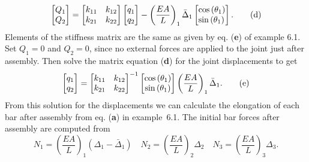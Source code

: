 \documentclass{AeroStructure-ERJohnson}
\begin{document}
\begin{example*}
\begin{gather}
\left[\begin{array}{@{}l@{}}Q_{1} \\Q_{2}\end{array}\right]=\left[\begin{array}{@{}ll@{}}k_{11} & k_{12} \\k_{21} & k_{22}\end{array}\right]\left[\begin{array}{@{}l@{}}q_{1} \\q_{2}\end{array}\right]-\left(\frac{E A}{L}\right)_{1}\bar{\Delta}_{1}\left[\begin{array}{@{}l@{}}\cos \left(\theta_{1}\right) \\\sin \left(\theta_{1}\right)\end{array}\right].\tag{d}
\end{gather}
Elements of the stiffness matrix are the same as given by eq. (\textbf{e}) of example 6.1. Set $Q_{1}=0$ and $Q_{2}=0$, since no external forces are applied to the joint just after assembly. Then solve the matrix equation (\textbf{d}) for the joint displacements to get
\begin{equation*}
\left[\begin{array}{@{}l@{}}q_{1} \\q_{2}\end{array}\right]=\left[\begin{array}{@{}ll@{}}k_{11} & k_{12} \\k_{21} & k_{22}\end{array}\right]^{-1}\left[\begin{array}{@{}c@{}}\cos \left(\theta_{1}\right) \\\sin \left(\theta_{1}\right)\end{array}\right]\left(\frac{E A}{L}\right)_{1} \bar{\Delta}_{1}.\tag{e}
\end{equation*}
From this solution for the displacements we can calculate the elongation of each bar after assembly from eq. (\textbf{a}) in example~6.1. The initial bar forces after assembly are computed from
\begin{equation*}
N_{1}=\left(\frac{E A}{L}\right)_{1}\left(\Delta_{1}-\bar{\Delta}_{1}\right) \quad N_{2}=\left(\frac{E A}{L}\right)_{2} \Delta_{2} \quad N_{3}=\left(\frac{E A}{L}\right)_{3} \Delta_{3}.\tag{f}
\end{equation*}

\vspace*{-1pc}


\end{example*}
\end{document}
